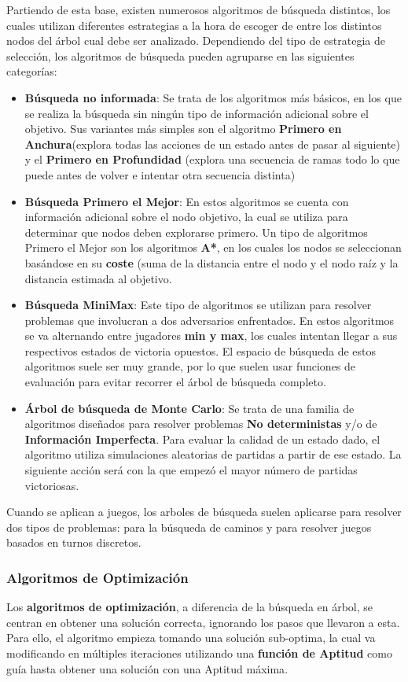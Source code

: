 Partiendo de esta base, existen numerosos algoritmos de búsqueda distintos, los cuales utilizan diferentes estrategias a la hora de escoger de entre los distintos nodos del árbol cual debe ser analizado. Dependiendo del tipo de estrategia de selección, los algoritmos de búsqueda pueden agruparse en las siguientes categorías:
\begin{itemize}
\item \textbf{Búsqueda no informada}: Se trata de los algoritmos más básicos, en los que se realiza la búsqueda sin ningún tipo de información adicional sobre el objetivo. Sus variantes más simples son el algoritmo \textbf{Primero en Anchura}(explora todas las acciones de un estado antes de pasar al siguiente) y el \textbf{Primero en Profundidad} (explora una secuencia de ramas todo lo que puede antes de volver e intentar otra secuencia distinta)
\item \textbf{Búsqueda Primero el Mejor}: En estos algoritmos se cuenta con información adicional sobre el nodo objetivo, la cual se utiliza para determinar que nodos deben explorarse primero. Un tipo de algoritmos Primero el Mejor son los algoritmos \textbf{A*}, en los cuales los nodos se seleccionan basándose en su \textbf{coste} (suma de la distancia entre el nodo y el nodo raíz y la distancia estimada al objetivo.
\item \textbf{Búsqueda MiniMax}: Este tipo de algoritmos se utilizan para resolver problemas que involucran a dos adversarios enfrentados. En estos algoritmos se va alternando entre jugadores \textbf{min y max}, los cuales intentan llegar a sus respectivos estados de victoria opuestos. El espacio de búsqueda de estos algoritmos suele ser muy grande, por lo que suelen usar funciones de evaluación para evitar recorrer el árbol de búsqueda completo.
\item \textbf{Árbol de búsqueda de Monte Carlo}: Se trata de una familia de algoritmos diseñados para resolver problemas \textbf{No deterministas} y/o de \textbf{Información Imperfecta}. Para evaluar la calidad de un estado dado, el algoritmo utiliza simulaciones aleatorias de partidas a partir de ese estado. La siguiente acción será con la que empezó el mayor número de partidas victoriosas.
\end{itemize} 

Cuando se aplican a juegos, los arboles de búsqueda suelen aplicarse para resolver dos tipos de problemas: para la búsqueda de caminos y para resolver juegos basados en turnos discretos.

\subsubsection{Algoritmos de Optimización}
Los \textbf{algoritmos de optimización}, a diferencia de la búsqueda en árbol, se centran en obtener una solución correcta, ignorando los pasos que llevaron a esta. Para ello, el algoritmo empieza tomando una solución sub-optima, la cual va modificando en múltiples iteraciones utilizando una \textbf{función de Aptitud} como guía hasta obtener una solución con una Aptitud máxima\cite{ai_and_games}.

